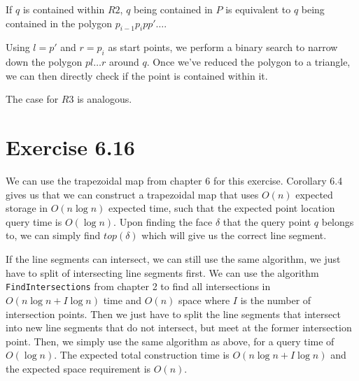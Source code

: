 \documentclass[11pt,a4paper]{article}
\begin{document}
If $q$ is contained within $R2$, $q$ being contained in $P$ is equivalent to
$q$ being contained in the polygon $p_{i-1} p_i p p' \ldots$.

Using $l = p'$ and $r = p_i$ as start points, we perform a binary search to
narrow down the polygon $p l \ldots r$ around $q$. Once we've reduced the
polygon to a triangle, we can then directly check if the point is contained
within it.

The case for $R3$ is analogous.


\section{Exercise 6.16}

We can use the trapezoidal map from chapter 6 for this
exercise. Corollary 6.4 gives us that we can construct a trapezoidal
map that uses $O(n)$ expected storage in $O(n \log n)$ expected time,
such that the expected point location query time is $O(\log n)$. Upon
finding the face $\delta$ that the query point $q$ belongs to, we can
simply find $top(\delta)$ which will give us the correct line segment.

If the line segments can intersect, we can still use the same
algorithm, we just have to split of intersecting line segments
first. We can use the algorithm \verb+FindIntersections+ from chapter
2 to find all intersections in $O(n \log n + I \log n)$ time and
$O(n)$ space where $I$ is the number of intersection points. Then we
just have to split the line segments that intersect into new line
segments that do not intersect, but meet at the former intersection
point. Then, we simply use the same algorithm as above, for a query
time of $O(\log n)$. The expected total construction time is $O(n \log
n + I \log n)$ and the expected space requirement is $O(n)$.
\end{document}
